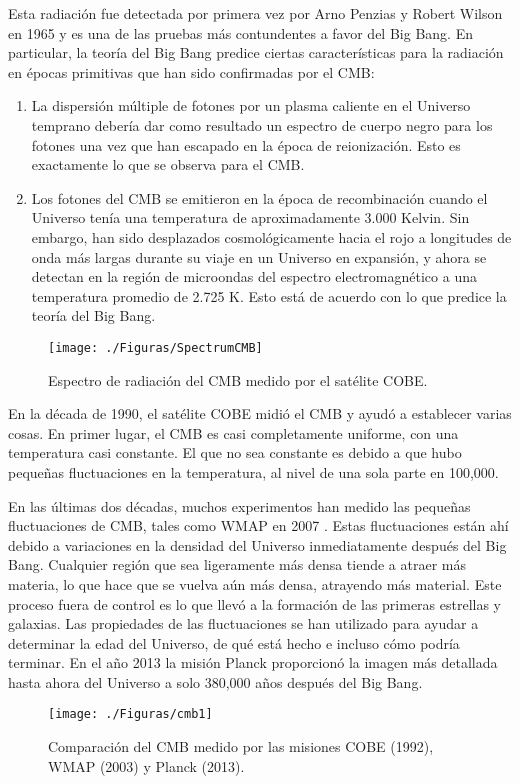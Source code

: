 \documentclass[a4paper,openright,10pt, oneside, final]{book}
\begin{document}
Esta radiación fue detectada por primera vez por Arno Penzias y Robert Wilson \cite{1.1.2.1} en 1965 y es una de las pruebas más contundentes a favor del Big Bang. En particular, la teoría del Big Bang predice ciertas características para la radiación en épocas primitivas que han sido confirmadas por el CMB:

\begin{enumerate}
\item La dispersión múltiple de fotones por un plasma caliente en el Universo temprano debería dar como resultado un espectro de cuerpo negro para los fotones una vez que han escapado en la época de reionización. Esto es exactamente lo que se observa para el CMB.
\item Los fotones del CMB se emitieron en la época de recombinación cuando el Universo tenía una temperatura de aproximadamente 3.000 Kelvin. Sin embargo, han sido desplazados cosmológicamente hacia el rojo a longitudes de onda más largas durante su viaje en un Universo en expansión, y ahora se detectan en la región de microondas del espectro electromagnético a una temperatura promedio de 2.725 K. Esto está de acuerdo con lo que predice la teoría del Big Bang. 
\end{enumerate}
\begin{figure}
\centering
  \texttt{[image: ./Figuras/SpectrumCMB]}
  \caption{\footnotesize{Espectro de radiación del CMB medido por el satélite COBE.}}
  \label{fig 1.3}
\end{figure}
En la década de 1990, el satélite COBE midió el CMB  y ayudó a establecer varias cosas. En primer lugar, el CMB es casi completamente uniforme, con una temperatura casi constante. El que no sea constante es debido a que hubo pequeñas fluctuaciones en la temperatura, al nivel de una sola parte en 100,000. 

En las últimas dos décadas, muchos experimentos han medido las pequeñas fluctuaciones de CMB, tales como WMAP en 2007 \cite{1.1.3} . Estas fluctuaciones están ahí debido a variaciones en la densidad del Universo inmediatamente después del Big Bang. Cualquier región que sea ligeramente más densa tiende a atraer más materia, lo que hace que se vuelva aún más densa, atrayendo más material. Este proceso fuera de control es lo que llevó a la formación de las primeras estrellas y galaxias. Las propiedades de las fluctuaciones se han utilizado para ayudar a determinar la edad del Universo, de qué está hecho e incluso cómo podría terminar. En el año 2013 la misión Planck \cite{1.1.4} proporcionó la imagen más detallada hasta ahora del Universo a solo 380,000 años después del Big Bang.
\begin{figure}
\centering
  \texttt{[image: ./Figuras/cmb1]}
  \caption{\footnotesize{Comparación del CMB medido por las misiones COBE (1992), WMAP (2003) y Planck (2013).}}
  \label{fig 1.4}
\end{figure}
\end{document}
